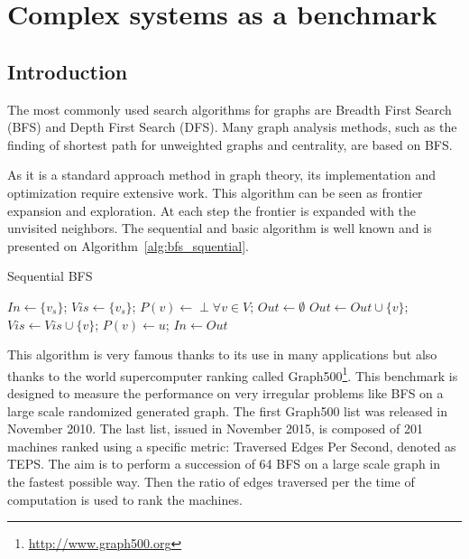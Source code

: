  




\chapter{Complex systems as a benchmark} 



\section{Introduction}
The most commonly used search algorithms for graphs are Breadth First Search (BFS) and Depth First Search (DFS).
Many graph analysis methods, such as the finding of shortest path for unweighted graphs and centrality, are based on BFS. 

As it is a standard approach method in graph theory, its implementation and optimization require extensive work. 
This algorithm can be seen as frontier expansion and exploration. 
At each step the frontier is expanded with the unvisited neighbors.  
The sequential and basic algorithm is well known and is presented on Algorithm~\ref{alg:bfs_squential}.
\begin{algorithm}
\caption{Sequential BFS}\label{alg:bfs_squential}
\begin{algorithmic}[1]
\State $In \gets \{v_s\}$;
\State $Vis \gets \{v_s\}$;
\State $P(v) \gets \perp \forall v \in V$;
	\State $Out \gets \emptyset$
				\State $Out \leftarrow Out \cup \{v\}$;
				\State $Vis \gets Vis \cup \{v\}$;
				\State $P(v) \leftarrow u$;
			\EndIf
		\EndFor
	\EndFor
	\State $In \gets Out$
\EndWhile
\EndFunction
\end{algorithmic}
\end{algorithm}

This algorithm is very famous thanks to its use in many applications but also thanks to the world supercomputer ranking called Graph500\footnote{\url{http://www.graph500.org}}.
This benchmark is designed to measure the performance on very irregular problems like BFS on a large scale randomized generated graph. 
The first Graph500 list was released in November 2010.
The last list, issued in November 2015, is composed of 201 machines ranked using a specific metric: Traversed Edges Per Second, denoted as TEPS. 
The aim is to perform a succession of 64 BFS on a large scale graph in the fastest possible way.
Then the ratio of edges traversed per the time of computation is used to rank the machines.

